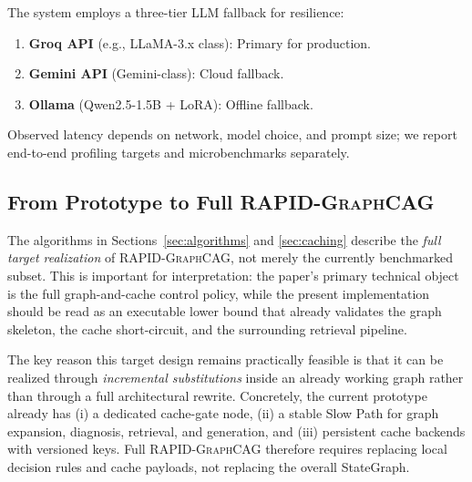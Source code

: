 \documentclass[11pt,a4paper,twocolumn]{article}
\newcommand{\rapid}{\textsc{RAPID-GraphCAG}}
\begin{document}
The system employs a three-tier LLM fallback for resilience:

\begin{enumerate}[leftmargin=*]
  \item \textbf{Groq API} (e.g., LLaMA-3.x class): Primary for production.
  \item \textbf{Gemini API} (Gemini-class): Cloud fallback.
  \item \textbf{Ollama} (Qwen2.5-1.5B + LoRA): Offline fallback.
\end{enumerate}

Observed latency depends on network, model choice, and prompt size; we report end-to-end profiling targets and microbenchmarks separately.

\subsection{From Prototype to Full \rapid{}}

The algorithms in Sections~\ref{sec:algorithms} and \ref{sec:caching} describe the \emph{full target realization} of \rapid{}, not merely the currently benchmarked subset. This is important for interpretation: the paper's primary technical object is the full graph-and-cache control policy, while the present implementation should be read as an executable lower bound that already validates the graph skeleton, the cache short-circuit, and the surrounding retrieval pipeline.

The key reason this target design remains practically feasible is that it can be realized through \emph{incremental substitutions} inside an already working graph rather than through a full architectural rewrite. Concretely, the current prototype already has (i) a dedicated cache-gate node, (ii) a stable Slow Path for graph expansion, diagnosis, retrieval, and generation, and (iii) persistent cache backends with versioned keys. Full \rapid{} therefore requires replacing local decision rules and cache payloads, not replacing the overall StateGraph.
\end{document}
